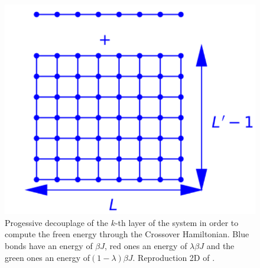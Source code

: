 \begin{figure}
\begin{minipage}[t]{0.32\linewidth}
		\includegraphics[width=\linewidth]{numerical/cross-h1.pdf}
		\caption*{$H_1$}
	\end{minipage}
	\caption{Progessive decouplage of the $k$-th layer of the system in order to compute the freen energy through the Crossover Hamiltonian. Blue bonds have an energy of $\beta J$, red ones an energy of $\lambda \beta J $ and the green ones an energy of$ (1-\lambda) \beta J$. Reproduction 2D of \cite{ vasilyev_universal_2009}.}
	\label{decouplage}
\end{figure}

